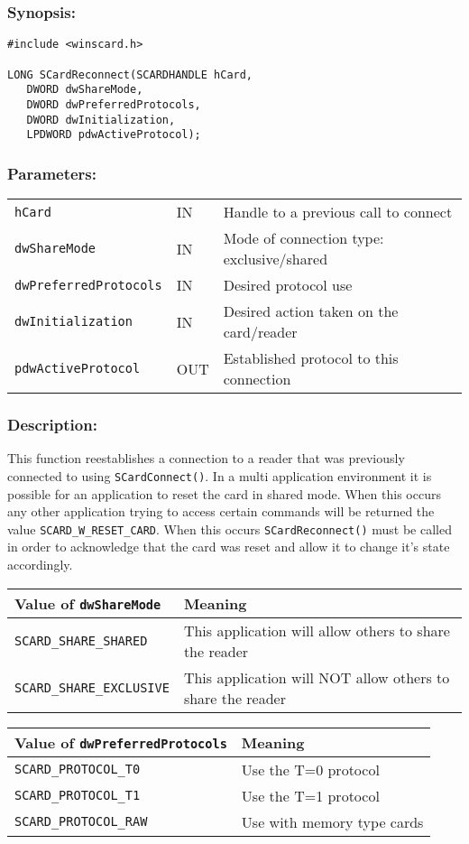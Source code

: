 \documentclass[a4paper,12pt]{article}
\newcommand{\synopsis}{\subsubsection{Synopsis:}}
\newcommand{\parameters}{\subsubsection{Parameters:}}
\newcommand{\desc}{\subsubsection{Description:}}
\begin{document}
\synopsis

\begin{verbatim}
#include <winscard.h>

LONG SCardReconnect(SCARDHANDLE hCard,
   DWORD dwShareMode,
   DWORD dwPreferredProtocols,
   DWORD dwInitialization,
   LPDWORD pdwActiveProtocol);
\end{verbatim}

\parameters

\begin{tabular}{lll}
\texttt{hCard} & IN & Handle to a previous call to connect\\
\texttt{dwShareMode} & IN & Mode of connection type: exclusive/shared\\
\texttt{dwPreferredProtocols} & IN & Desired protocol use\\
\texttt{dwInitialization} & IN & Desired action taken on the card/reader\\
\texttt{pdwActiveProtocol} & OUT & Established protocol to this connection\\
\end{tabular}

\desc

This function reestablishes a connection to a reader that was previously
connected to using \texttt{SCardConnect()}.  In a multi application
environment it is possible for an application to reset the card in
shared mode. When this occurs any other application trying to access
certain commands will be returned the value
\texttt{SCARD\_W\_RESET\_CARD}. When this occurs
\texttt{SCardReconnect()} must be called in order to acknowledge that
the card was reset and allow it to change it's state accordingly.


\begin{tabular}{|l|l|}
\hline
Value of \texttt{dwShareMode} & Meaning \\
\hline
\hline
\texttt{SCARD\_SHARE\_SHARED} & This application will allow others to share the
reader\\
\hline
\texttt{SCARD\_SHARE\_EXCLUSIVE} & This application will NOT allow others to
share the reader\\
\hline
\end{tabular}

\begin{tabular}{|l|l|}
\hline
Value of \texttt{dwPreferredProtocols} & Meaning \\
\hline
\hline
\texttt{SCARD\_PROTOCOL\_T0} & Use the T=0 protocol \\
\hline
\texttt{SCARD\_PROTOCOL\_T1} & Use the T=1 protocol \\
\hline
\texttt{SCARD\_PROTOCOL\_RAW} & Use with memory type cards \\
\hline
\end{tabular}
\end{document}
